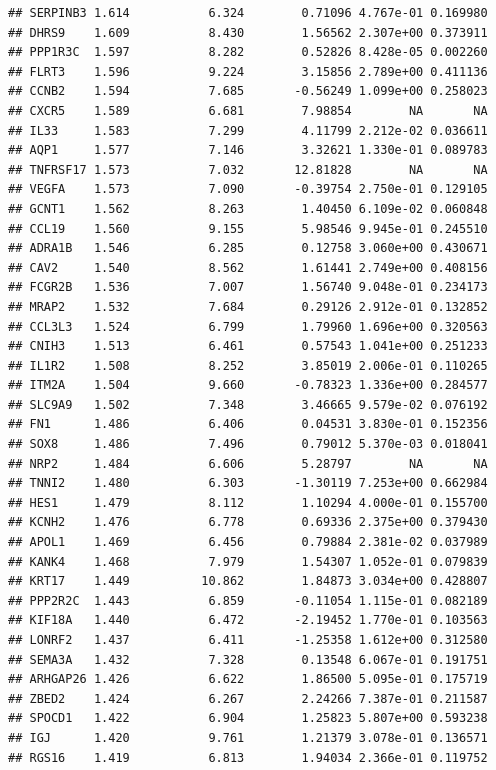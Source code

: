 \documentclass{article}\usepackage[]{graphicx}\usepackage[]{color}
\makeatletter
\newenvironment{kframe}{%
 \def\at@end@of@kframe{}%
 \ifinner\ifhmode%
  \def\at@end@of@kframe{\end{minipage}}%
  \begin{minipage}{\columnwidth}%
 \fi\fi%
 \def\FrameCommand##1{\hskip\@totalleftmargin \hskip-\fboxsep
 \colorbox{shadecolor}{##1}\hskip-\fboxsep
     \hskip-\linewidth \hskip-\@totalleftmargin \hskip\columnwidth}%
 \MakeFramed {\advance\hsize-\width
   \@totalleftmargin\z@ \linewidth\hsize
   \@setminipage}}%
 {\par\unskip\endMakeFramed%
 \at@end@of@kframe}
\newenvironment{knitrout}{}{} %
\makeatother
\begin{document}
\begin{knitrout}
\begin{kframe}
\begin{verbatim}
## SERPINB3 1.614           6.324        0.71096 4.767e-01 0.169980
## DHRS9    1.609           8.430        1.56562 2.307e+00 0.373911
## PPP1R3C  1.597           8.282        0.52826 8.428e-05 0.002260
## FLRT3    1.596           9.224        3.15856 2.789e+00 0.411136
## CCNB2    1.594           7.685       -0.56249 1.099e+00 0.258023
## CXCR5    1.589           6.681        7.98854        NA       NA
## IL33     1.583           7.299        4.11799 2.212e-02 0.036611
## AQP1     1.577           7.146        3.32621 1.330e-01 0.089783
## TNFRSF17 1.573           7.032       12.81828        NA       NA
## VEGFA    1.573           7.090       -0.39754 2.750e-01 0.129105
## GCNT1    1.562           8.263        1.40450 6.109e-02 0.060848
## CCL19    1.560           9.155        5.98546 9.945e-01 0.245510
## ADRA1B   1.546           6.285        0.12758 3.060e+00 0.430671
## CAV2     1.540           8.562        1.61441 2.749e+00 0.408156
## FCGR2B   1.536           7.007        1.56740 9.048e-01 0.234173
## MRAP2    1.532           7.684        0.29126 2.912e-01 0.132852
## CCL3L3   1.524           6.799        1.79960 1.696e+00 0.320563
## CNIH3    1.513           6.461        0.57543 1.041e+00 0.251233
## IL1R2    1.508           8.252        3.85019 2.006e-01 0.110265
## ITM2A    1.504           9.660       -0.78323 1.336e+00 0.284577
## SLC9A9   1.502           7.348        3.46665 9.579e-02 0.076192
## FN1      1.486           6.406        0.04531 3.830e-01 0.152356
## SOX8     1.486           7.496        0.79012 5.370e-03 0.018041
## NRP2     1.484           6.606        5.28797        NA       NA
## TNNI2    1.480           6.303       -1.30119 7.253e+00 0.662984
## HES1     1.479           8.112        1.10294 4.000e-01 0.155700
## KCNH2    1.476           6.778        0.69336 2.375e+00 0.379430
## APOL1    1.469           6.456        0.79884 2.381e-02 0.037989
## KANK4    1.468           7.979        1.54307 1.052e-01 0.079839
## KRT17    1.449          10.862        1.84873 3.034e+00 0.428807
## PPP2R2C  1.443           6.859       -0.11054 1.115e-01 0.082189
## KIF18A   1.440           6.472       -2.19452 1.770e-01 0.103563
## LONRF2   1.437           6.411       -1.25358 1.612e+00 0.312580
## SEMA3A   1.432           7.328        0.13548 6.067e-01 0.191751
## ARHGAP26 1.426           6.622        1.86500 5.095e-01 0.175719
## ZBED2    1.424           6.267        2.24266 7.387e-01 0.211587
## SPOCD1   1.422           6.904        1.25823 5.807e+00 0.593238
## IGJ      1.420           9.761        1.21379 3.078e-01 0.136571
## RGS16    1.419           6.813        1.94034 2.366e-01 0.119752

\end{verbatim}
\end{kframe}
\end{knitrout}
\end{document}
